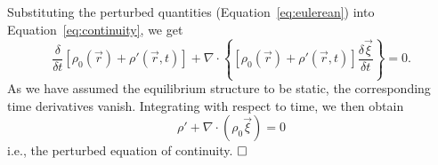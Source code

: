 \begin{description}
    Substituting the perturbed quantities (Equation~\ref{eq:eulerean}) into Equation~\ref{eq:continuity}, we get 
    \begin{equation}
        \frac{\delta}{\delta t} \left[
            \rho_0(\vec r)
            +
            \rho' (\vec r, t)
        \right]
        +
        \nabla\cdot \left\{
            \left[
                \rho_0(\vec r)
                +
                \rho'(\vec r, t)
            \right]
            \frac{\delta\vec\xi}{\delta t} 
        \right\}
        =
        0.
    \end{equation}
    As we have assumed the equilibrium structure to be static, the corresponding time derivatives vanish. 
    Integrating with respect to time, we then obtain
    \begin{equation} \label{eq:perturbed-continuity} \boxed{
        \rho' 
        + 
        \nabla \cdot \left( 
            \rho_0 \vec\xi 
        \right) 
        = 
        0
    }\end{equation}
    i.e., the perturbed equation of continuity. $\hfill\square\;$
    

\end{description}
